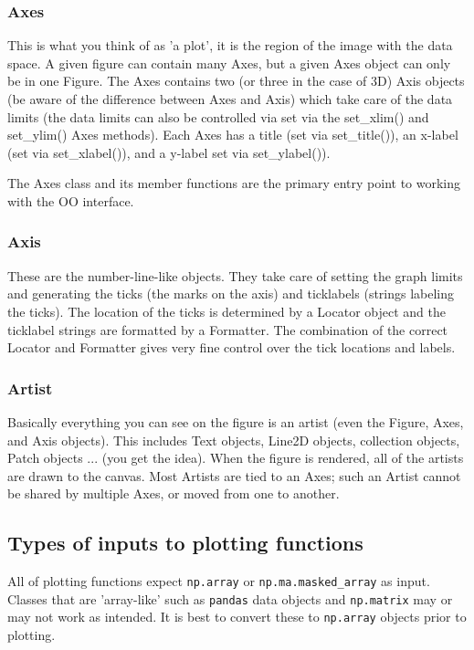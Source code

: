 \subsubsection{Axes}

This is what you think of as 'a plot', it is the region of the image with the data space. A given figure can contain many Axes, but a given Axes object can only be in one Figure. The Axes contains two (or three in the case of 3D) Axis objects (be aware of the difference between Axes and Axis) which take care of the data limits (the data limits can also be controlled via set via the set\_xlim() and set\_ylim() Axes methods). Each Axes has a title (set via set\_title()), an x-label (set via set\_xlabel()), and a y-label set via set\_ylabel()).

The Axes class and its member functions are the primary entry point to working with the OO interface.

\subsubsection{Axis}

These are the number-line-like objects. They take care of setting the graph limits and generating the ticks (the marks on the axis) and ticklabels (strings labeling the ticks). The location of the ticks is determined by a Locator object and the ticklabel strings are formatted by a Formatter. The combination of the correct Locator and Formatter gives very fine control over the tick locations and labels.

\subsubsection{Artist}

Basically everything you can see on the figure is an artist (even the Figure, Axes, and Axis objects). This includes Text objects, Line2D objects, collection objects, Patch objects ... (you get the idea). When the figure is rendered, all of the artists are drawn to the canvas. Most Artists are tied to an Axes; such an Artist cannot be shared by multiple Axes, or moved from one to another.

\subsection{Types of inputs to plotting functions}

All of plotting functions expect \texttt{np.array} or \texttt{np.ma.masked\_array} as input. Classes that are 'array-like' such as \texttt{pandas} data objects and \texttt{np.matrix} may or may not work as intended. It is best to convert these to \texttt{np.array} objects prior to plotting.

